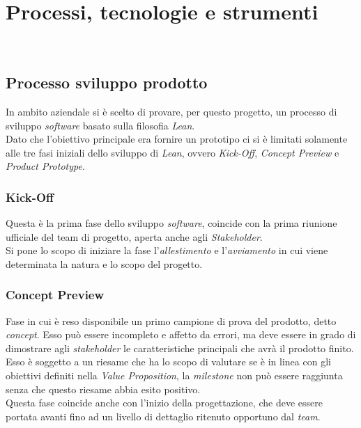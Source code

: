 
\chapter{Processi, tecnologie e strumenti}
\label{cap:processi-metodologie}

\\

\section{Processo sviluppo prodotto}
In ambito aziendale si è scelto di provare, per questo progetto, un processo di sviluppo \emph{software} basato sulla filosofia \emph{Lean}.\\
Dato che l'obiettivo principale era fornire un prototipo ci si è limitati solamente alle tre fasi iniziali dello sviluppo di \emph{Lean}, ovvero \emph{Kick-Off}, \emph{Concept Preview} e \emph{Product Prototype}.


\subsection{Kick-Off}
Questa è la prima fase dello sviluppo \emph{software}, coincide con la prima riunione ufficiale del team di progetto, aperta anche agli \emph{Stakeholder}.\\
Si pone lo scopo di iniziare la fase l'\emph{allestimento} e l'\emph{avviamento} in cui viene determinata la natura e lo scopo del progetto.\\

\subsection{Concept Preview}
Fase in cui è reso disponibile un primo campione di prova del prodotto, detto \emph{concept}. Esso può essere incompleto e affetto da errori, ma deve essere in grado di dimostrare agli \emph{stakeholder} le caratteristiche principali che avrà il prodotto finito.\\
Esso è soggetto a un riesame che ha lo scopo di valutare se è in linea con gli obiettivi definiti nella \emph{Value Proposition}, la \emph{milestone} non può essere raggiunta senza che questo riesame abbia esito positivo.\\
Questa fase coincide anche con l'inizio della progettazione, che deve essere portata avanti fino ad un livello di dettaglio ritenuto opportuno dal \emph{team}.\\

